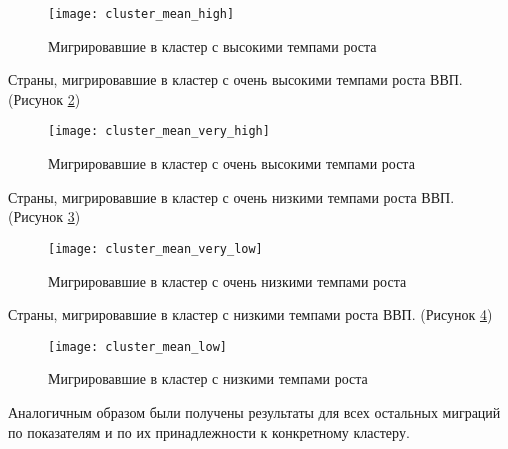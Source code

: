 \begin{figure}[h]
	\centering \texttt{[image: cluster\_mean\_high]}
	\caption{Мигрировавшие в кластер с высокими темпами роста}
	\label{fig:cluster_mean_high}
\end{figure}

Страны, мигрировавшие в кластер с очень высокими темпами роста ВВП. (Рисунок \ref{fig:cluster_mean_very_high})

\begin{figure}[h]
	\centering \texttt{[image: cluster\_mean\_very\_high]}
	\caption{Мигрировавшие в кластер с очень высокими темпами роста}
	\label{fig:cluster_mean_very_high}
\end{figure}

Страны, мигрировавшие в кластер с очень низкими темпами роста ВВП. (Рисунок \ref{fig:cluster_mean_very_low})

\begin{figure}[h]
	\centering \texttt{[image: cluster\_mean\_very\_low]}
	\caption{Мигрировавшие в кластер с очень низкими темпами роста}
	\label{fig:cluster_mean_very_low}
\end{figure}

\newpage

Страны, мигрировавшие в кластер с низкими темпами роста ВВП. (Рисунок \ref{fig:cluster_mean_low})

\begin{figure}[h]
	\centering \texttt{[image: cluster\_mean\_low]}
	\caption{Мигрировавшие в кластер с низкими темпами роста}
	\label{fig:cluster_mean_low}
\end{figure}

Аналогичным образом были получены результаты для всех остальных миграций по показателям и по их принадлежности к конкретному кластеру.